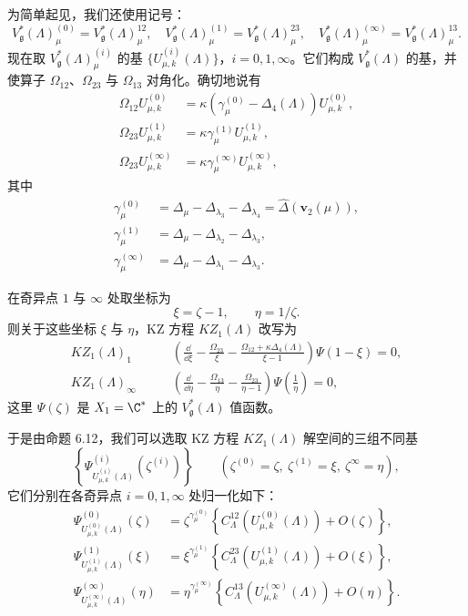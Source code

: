 为简单起见，我们还使用记号：
\[
V^{*}_{\mathfrak{g}}(\Lambda)^{(0)}_{\mu}
=V^{*}_{\mathfrak{g}}(\Lambda)^{12}_{\mu},\quad
V^{*}_{\mathfrak{g}}(\Lambda)^{(1)}_{\mu}
=V^{*}_{\mathfrak{g}}(\Lambda)^{23}_{\mu},\quad
V^{*}_{\mathfrak{g}}(\Lambda)^{(\infty)}_{\mu}
=V^{*}_{\mathfrak{g}}(\Lambda)^{13}_{\mu}.
\]
现在取 $V^{*}_{\mathfrak{g}}(\Lambda)^{(i)}_{\mu}$ 的基
$\{U^{(i)}_{\mu,k}(\Lambda)\}$，$i=0,1,\infty$。它们构成
$V^{*}_{\mathfrak{g}}(\Lambda)$ 的基，并使算子 $\Omega_{12}$、$\Omega_{23}$
与 $\Omega_{13}$ 对角化。确切地说有
\[
\begin{aligned}
\Omega_{12}U^{(0)}_{\mu,k}
&=\kappa(\gamma^{(0)}_{\mu}-\Delta_4(\Lambda))U^{(0)}_{\mu,k},\\
\Omega_{23}U^{(1)}_{\mu,k}
&=\kappa\gamma^{(1)}_{\mu}U^{(1)}_{\mu,k},\\
\Omega_{23}U^{(\infty)}_{\mu,k}
&=\kappa\gamma^{(\infty)}_{\mu}U^{(\infty)}_{\mu,k},
\end{aligned}
\]
其中
\[
\begin{aligned}
\gamma^{(0)}_{\mu}&=\Delta_\mu-\Delta_{\lambda_3}-\Delta_{\lambda_4}
=\widehat{\Delta}(\mathbf{v}_2(\mu)),\\
\gamma^{(1)}_{\mu}&=\Delta_\mu-\Delta_{\lambda_2}-\Delta_{\lambda_3},\\
\gamma^{(\infty)}_{\mu}&=\Delta_\mu-\Delta_{\lambda_1}-\Delta_{\lambda_3}.
\end{aligned}
\]

在奇异点 $1$ 与 $\infty$ 处取坐标为
\[
\xi=\zeta-1,\qquad \eta=1/\zeta .
\]
则关于这些坐标 $\xi$ 与 $\eta$，KZ 方程 $KZ_1(\Lambda)$ 改写为
\[
\begin{aligned}
KZ_1(\Lambda)_1\qquad
&\left(\frac{\dd}{\dd\xi}-\frac{\Omega_{23}}{\xi}
-\frac{\Omega_{12}+\kappa\Delta_4(\Lambda)}{\xi-1}\right)\Psi(1-\xi)=0,\\
KZ_1(\Lambda)_\infty\qquad
&\left(\frac{\dd}{\dd\eta}-\frac{\Omega_{13}}{\eta}
-\frac{\Omega_{23}}{\eta-1}\right)\Psi\left(\frac{1}{\eta}\right)=0,
\end{aligned}
\]
这里 $\Psi(\zeta)$ 是 $X_1=\C^*$ 上的 $V^{*}_{\mathfrak{g}}(\Lambda)$ 值函数。


于是由命题 6.12，我们可以选取 KZ 方程 $KZ_1(\Lambda)$ 解空间的三组不同基
\[
\left\{\Psi^{(i)}_{U^{(i)}_{\mu,k}(\Lambda)}(\zeta^{(i)})\right\}
\qquad(\zeta^{(0)}=\zeta,\ \zeta^{(1)}=\xi,\ \zeta^{\infty}=\eta),
\]
它们分别在各奇异点 $i=0,1,\infty$ 处归一化如下：
\[
\begin{aligned}
\Psi^{(0)}_{U^{(0)}_{\mu,k}(\Lambda)}(\zeta)
&=\zeta^{\gamma^{(0)}_{\mu}}
 \left\{C^{12}_{\Lambda}(U^{(0)}_{\mu,k}(\Lambda))+O(\zeta)\right\},\\
\Psi^{(1)}_{U^{(1)}_{\mu,k}(\Lambda)}(\xi)
&=\xi^{\gamma^{(1)}_{\mu}}
 \left\{C^{23}_{\Lambda}(U^{(1)}_{\mu,k}(\Lambda))+O(\xi)\right\},\\
\Psi^{(\infty)}_{U^{(\infty)}_{\mu,k}(\Lambda)}(\eta)
&=\eta^{\gamma^{(\infty)}_{\mu}}
 \left\{C^{13}_{\Lambda}(U^{(\infty)}_{\mu,k}(\Lambda))+O(\eta)\right\}.
\end{aligned}
\]

